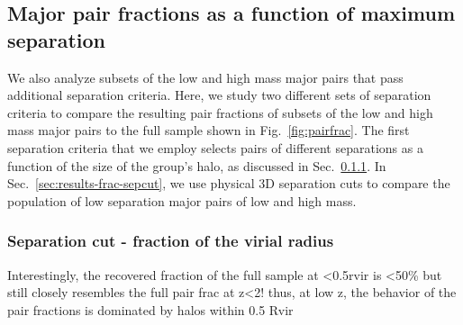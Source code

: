 \documentclass[twocolumn]{aastex631}
\begin{document}

\subsection{Major pair fractions as a function of maximum separation}\label{sec:results-frac-cuts}
    We also analyze subsets of the low and high mass major pairs that pass additional separation criteria. 
    Here, we study two different sets of separation criteria to compare the resulting pair fractions of subsets of the low and high mass major pairs to the full sample shown in Fig.~\ref{fig:pairfrac}.
    The first separation criteria that we employ selects pairs of different separations as a function of the size of the group's halo, as discussed in Sec.~\ref{sec:results-frac-vircut}. 
    In Sec.~\ref{sec:results-frac-sepcut}, we use physical 3D separation cuts to compare the population of low separation major pairs of low and high mass. 

\subsubsection{Separation cut - fraction of the virial radius}\label{sec:results-frac-vircut}
              Interestingly, the recovered fraction of the full sample at <0.5rvir is <50\% but still closely resembles the full pair frac at z<2! thus, at low z, the behavior of the pair fractions is dominated by halos within 0.5 Rvir ~~ 
\end{document}
